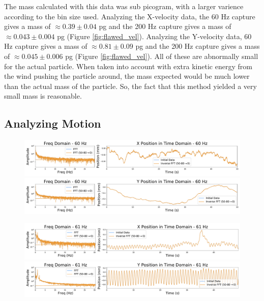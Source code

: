 \documentclass[12pt]{article}
\begin{document}
The mass calculated with this data was sub picogram, with a larger varience according to the bin size used. Analyzing the X-velocity data, the 60 Hz capture gives a mass of $\approx 0.39 \pm 0.04$ pg and the 200 Hz capture gives a mass of $\approx 0.043 \pm 0.004$ pg (Figure \ref{fig:flawed_vel}). Analyzing the Y-velocity data, 60 Hz capture gives a mass of $\approx 0.81 \pm 0.09$ pg and the 200 Hz capture gives a mass of $\approx 0.045 \pm 0.006$ pg (Figure \ref{fig:flawed_vel}). All of these are abnormally small for the actual particle. When taken into account with extra kinetic energy from the wind pushing the particle around, the mass expected would be much lower than the actual mass of the particle. So, the fact that this method yielded a very small mass is reasonable.

\subsection{Analyzing Motion}
\begin{figure}[!ht]
\centering
    \includegraphics[width=\textwidth]{data_01_x_pos.pdf}
    \includegraphics[width=\textwidth]{data_01_y_pos.pdf}
	\caption{}
    \label{fig:01_pos}
\end{figure}

\begin{figure}[!ht]
\centering
    \includegraphics[width=\textwidth]{data_03_x_pos.pdf}
    \includegraphics[width=\textwidth]{data_03_y_pos.pdf}
	\caption{}
    \label{fig:03_pos}
\end{figure}
\end{document}
